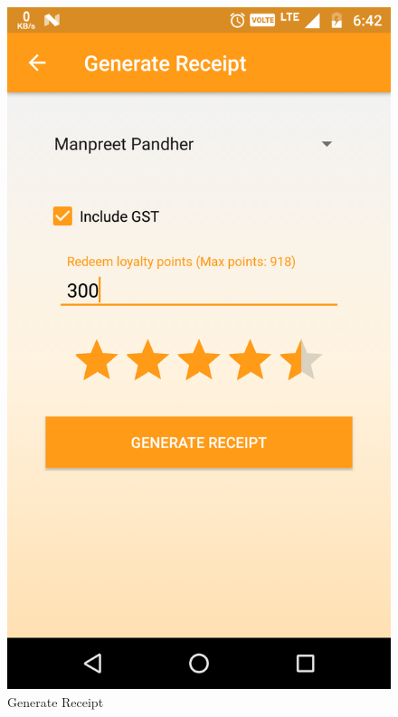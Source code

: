 \\
\begin{figure}[h]
	\centering
	\includegraphics[width=0.7\linewidth]{GenerateReceipt}
	\caption{Generate Receipt}
\end{figure}
\pagebreak

